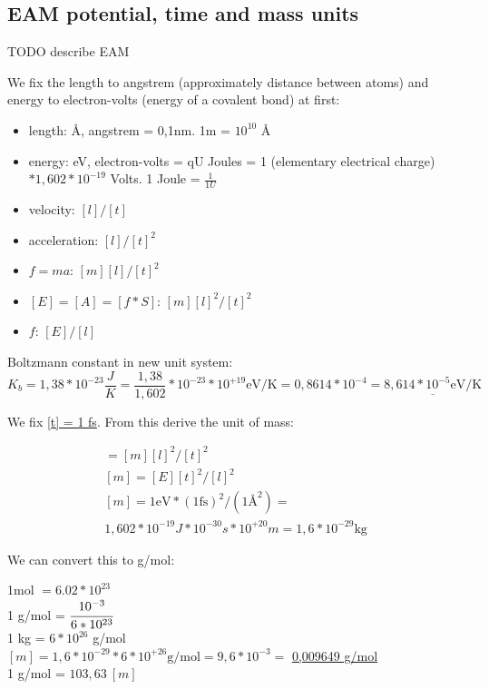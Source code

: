 \documentclass[12pt,a4paper]{article}
\begin{document}
\subsection*{EAM potential, time and mass units}

TODO describe EAM

We fix the length to angstrem (approximately distance between atoms) and energy to electron-volts (energy of a covalent bond) at first:

\begin{itemize}
	\item length: Å, angstrem = 0,1nm. 1m = $10^{10}$ Å
	\item energy: eV, electron-volts = qU Joules = 1 (elementary electrical charge) $* 1,602 * 10^{-19}$ Volts. 1 Joule = $\frac{1}{1U}$
	\item velocity: $[l]/[t]$
	\item acceleration: $[l]/[t]^2$
	\item $f=ma$:       $[m][l]/[t]^2$
	\item $[E]=[A]=[f*S]$:    $[m][l]^2/[t]^2$
	\item $f$: $[E]/[l]$
\end{itemize}

Boltzmann constant in new unit system: \[ K_b = 1,38 * 10^{-23} \frac{J}{K} = \frac{1,38}{1,602} * 10^{-23} * 10^{+19} \text{eV/K} = 0,8614 * 10^{-4} = \underline{8,614 * 10^{-5} \text{eV/K}} \]

We fix \underline{[t] = 1 fs}. From this derive the unit of mass: 

\begin{gather*}
	[E] = [m][l]^2/[t]^2\\
	[m] = [E][t]^2/[l]^2\\
	[m] = 1 \text{eV} * (1 \text{fs})^2 / (1 \text{Å}^2) =\\
	1,602 * 10^{-19} J * 10^{-30} s * 10^{+20} m = 1,6 * 10^{-29} \text{kg}
\end{gather*}

We can convert this to g/mol:
\begin{center}
	1mol $= 6.02 * 10^{23}$\\
	1 g/mol = $\cfrac{10^{-3}}{6 * 10^{23}} $\\
	1 kg = $6 * 10^{26}$ g/mol\\
	$[m] = 1,6 * 10^{-29} * 6 * 10^{+26} \text{g/mol} = 9,6 * 10^{-3} =$ \underline{0,009649 g/mol}\\
	1 g/mol = $103,63\ [m]$
\end{center}
\end{document}
